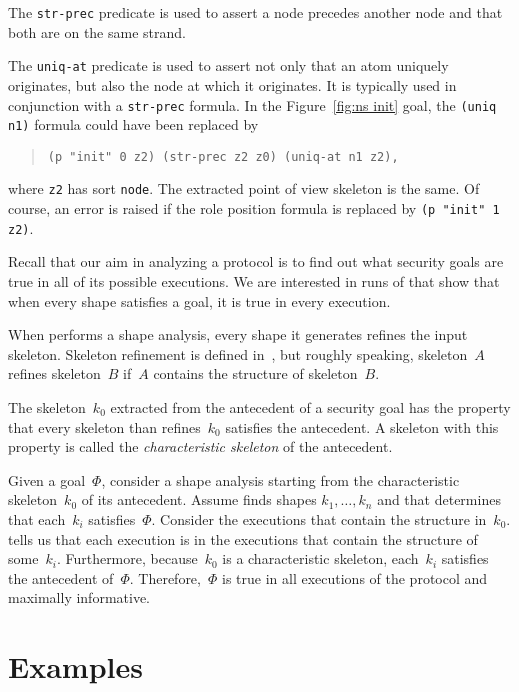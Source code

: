 \documentclass[12pt]{article}
\begin{document}
The \texttt{str-prec} predicate is used to assert a node precedes another
node and that both are on the same strand.

The \texttt{uniq-at} predicate is used to assert not only that an atom
uniquely originates, but also the node at which it originates.  It is
typically used in conjunction with a \texttt{str-prec} formula.  In
the Figure~\ref{fig:ns init} goal, the \texttt{(uniq n1)} formula
could have been replaced by
\begin{quote}
\begin{verbatim}
(p "init" 0 z2) (str-prec z2 z0) (uniq-at n1 z2),
\end{verbatim}
\end{quote}
where \texttt{z2} has sort \texttt{node}.  The extracted point of view
skeleton is the same.  Of course, an error is raised if the role
position formula is replaced by \texttt{(p "init" 1 z2)}.

Recall that our aim in analyzing a protocol is to find out what
security goals are true in all of its possible executions.  We are
interested in runs of {\cpsa} that show that when every shape
satisfies a goal, it is true in every execution.

When {\cpsa} performs a shape analysis, every shape it generates
refines the input skeleton.  Skeleton refinement is defined
in~\cite[Section~6]{cpsaprimer09}, but roughly speaking, skeleton~$A$
refines skeleton~$B$ if~$A$ contains the structure of skeleton~$B$.

The skeleton~$k_0$ extracted from the antecedent of a security goal
has the property that every skeleton than refines~$k_0$ satisfies the
antecedent.  A skeleton with this property is called the
\emph{characteristic skeleton} of the antecedent.

Given a goal~\(\Phi\), consider a shape analysis starting from the
characteristic skeleton~$k_0$ of its antecedent.  Assume {\cpsa} finds
shapes $k_1,\ldots,k_n$ and that {\cpsa} determines that each~$k_i$
satisfies~$\Phi$.  Consider the executions that contain the structure
in~$k_0$.  {\cpsa} tells us that each execution is in the executions
that contain the structure of some~$k_i$.  Furthermore, because~$k_0$
is a characteristic skeleton, each~$k_i$ satisfies the antecedent
of~$\Phi$.  Therefore,~$\Phi$ is true in all executions of the
protocol and maximally informative.

\section{Examples}\label{sec:examples}
\end{document}
